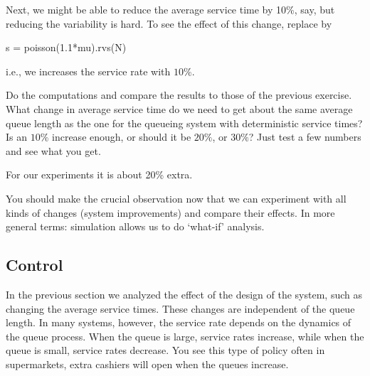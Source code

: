 \begin{exercise}
  Next, we might be able to reduce the average service time by 10\%, say, but reducing the variability is hard. To see the effect of this change, replace  by
  \begin{pyblock}
s = poisson(1.1*mu).rvs(N)    
  \end{pyblock}
i.e., we increases the service rate with $10\%$. 

Do the computations and compare the results to those of the previous exercise. What change in average service time do we need to get about the same average queue length as the one for the queueing system with deterministic service times? Is an $10\%$ increase enough, or should it be $20\%$, or $30\%$? Just test a few numbers and see what you get. 
  \begin{solution}
For our experiments it is about 20\% extra.
  \end{solution}
\end{exercise}

You should make the crucial observation now that we can experiment with all kinds of changes (system improvements) and compare their effects. In more general terms: simulation allows us to do `what-if' analysis. 

\subsection{Control }
\label{sec:control-}

In the previous section we analyzed the effect of the design of the system, such as changing the average service times. These changes are independent of the queue length. In many systems, however, the service rate depends on the dynamics of the queue process. When the queue is large, service rates increase, while when the queue is small, service rates decrease.  You see this type of policy often in supermarkets, extra cashiers will open when the queues increase.

